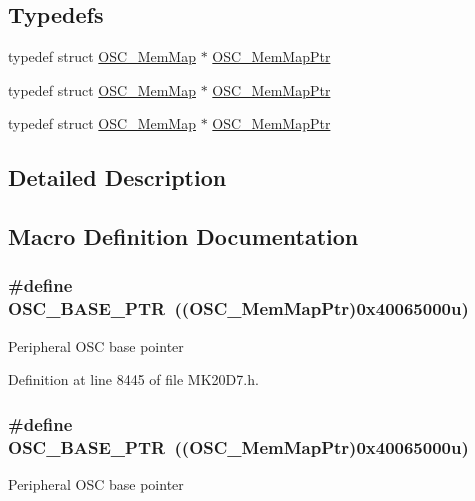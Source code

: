 \subsection*{Typedefs}
\begin{DoxyCompactItemize}
\item 
typedef struct \hyperlink{struct_o_s_c___mem_map}{O\+S\+C\+\_\+\+Mem\+Map} $\ast$ \hyperlink{group___o_s_c___peripheral_gaaa685163f549fdf24c28ec9b400310b5}{O\+S\+C\+\_\+\+Mem\+Map\+Ptr}
\item 
typedef struct \hyperlink{struct_o_s_c___mem_map}{O\+S\+C\+\_\+\+Mem\+Map} $\ast$ \hyperlink{group___o_s_c___peripheral_gaaa685163f549fdf24c28ec9b400310b5}{O\+S\+C\+\_\+\+Mem\+Map\+Ptr}
\item 
typedef struct \hyperlink{struct_o_s_c___mem_map}{O\+S\+C\+\_\+\+Mem\+Map} $\ast$ \hyperlink{group___o_s_c___peripheral_gaaa685163f549fdf24c28ec9b400310b5}{O\+S\+C\+\_\+\+Mem\+Map\+Ptr}
\end{DoxyCompactItemize}


\subsection{Detailed Description}


\subsection{Macro Definition Documentation}
\subsubsection[{\texorpdfstring{O\+S\+C\+\_\+\+B\+A\+S\+E\+\_\+\+P\+TR}{OSC_BASE_PTR}}]{\setlength{\rightskip}{0pt plus 5cm}\#define O\+S\+C\+\_\+\+B\+A\+S\+E\+\_\+\+P\+TR~(({\bf O\+S\+C\+\_\+\+Mem\+Map\+Ptr})0x40065000u)}\hypertarget{group___o_s_c___peripheral_gaf1086ccc399b36fe95a52c677e9936ac}{}\label{group___o_s_c___peripheral_gaf1086ccc399b36fe95a52c677e9936ac}
Peripheral O\+SC base pointer 

Definition at line 8445 of file M\+K20\+D7.\+h.

\subsubsection[{\texorpdfstring{O\+S\+C\+\_\+\+B\+A\+S\+E\+\_\+\+P\+TR}{OSC_BASE_PTR}}]{\setlength{\rightskip}{0pt plus 5cm}\#define O\+S\+C\+\_\+\+B\+A\+S\+E\+\_\+\+P\+TR~(({\bf O\+S\+C\+\_\+\+Mem\+Map\+Ptr})0x40065000u)}\hypertarget{group___o_s_c___peripheral_gaf1086ccc399b36fe95a52c677e9936ac}{}\label{group___o_s_c___peripheral_gaf1086ccc399b36fe95a52c677e9936ac}
Peripheral O\+SC base pointer 

